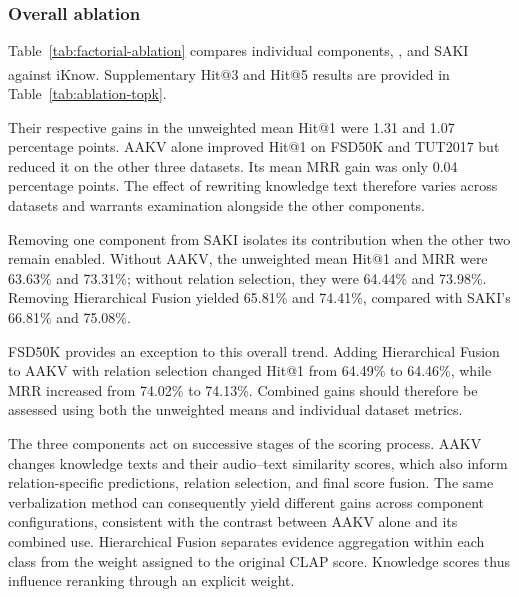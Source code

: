 \subsubsection{Overall ablation}\label{sec:overall-ablation}


Table~\ref{tab:factorial-ablation} compares individual components, , and SAKI against iKnow\textsuperscript{\dag}. Supplementary Hit@3 and Hit@5 results are provided in Table~\ref{tab:ablation-topk}.

 Their respective gains in the unweighted mean Hit@1 were 1.31 and 1.07 percentage points. AAKV alone improved Hit@1 on FSD50K and TUT2017 but reduced it on the other three datasets. Its mean MRR gain was only 0.04 percentage points. The effect of rewriting knowledge text therefore varies across datasets and warrants examination alongside the other components.


Removing one component from SAKI isolates its contribution when the other two remain enabled. Without AAKV, the unweighted mean Hit@1 and MRR were 63.63\% and 73.31\%; without relation selection, they were 64.44\% and 73.98\%. Removing Hierarchical Fusion yielded 65.81\% and 74.41\%, compared with SAKI's 66.81\% and 75.08\%.  

FSD50K provides an exception to this overall trend. Adding Hierarchical Fusion to AAKV with relation selection changed Hit@1 from 64.49\% to 64.46\%, while MRR increased from 74.02\% to 74.13\%.  Combined gains should therefore be assessed using both the unweighted means and individual dataset metrics.

The three components act on successive stages of the scoring process. AAKV changes knowledge texts and their audio--text similarity scores, which also inform relation-specific predictions, relation selection, and final score fusion. The same verbalization method can consequently yield different gains across component configurations, consistent with the contrast between AAKV alone and its combined use. Hierarchical Fusion separates evidence aggregation within each class from the weight assigned to the original CLAP score. Knowledge scores thus influence reranking through an explicit weight.






